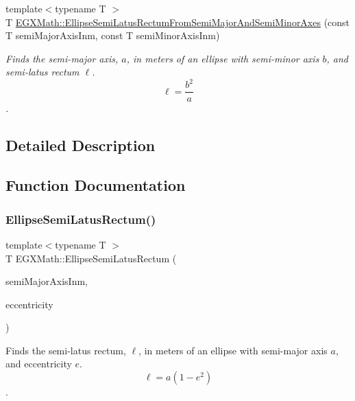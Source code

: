 \begin{DoxyCompactItemize}
{\footnotesize template$<$typename T $>$ }\\T \mbox{\hyperlink{group___e_g_x_math-_geometry-2_d-_ellipse-_semi_latus_rectum_ga8bb9235fdb20e3257489049022f4aeba}{E\+G\+X\+Math\+::\+Ellipse\+Semi\+Latus\+Rectum\+From\+Semi\+Major\+And\+Semi\+Minor\+Axes}} (const T semi\+Major\+Axis\+Inm, const T semi\+Minor\+Axis\+Inm)
\begin{DoxyCompactList}\small\item\em Finds the semi-\/major axis, $a$, in meters of an ellipse with semi-\/minor axis $b$, and semi-\/latus rectum $\ell$. \[ \ell= \frac{b^2}{a} \]. \end{DoxyCompactList}\end{DoxyCompactItemize}


\subsection{Detailed Description}


\subsection{Function Documentation}
\mbox{\label{group___e_g_x_math-_geometry-2_d-_ellipse-_semi_latus_rectum_gacfd1844eb4ef3d1ee3c0b460a6442ae6}} 
\subsubsection{\texorpdfstring{Ellipse\+Semi\+Latus\+Rectum()}{EllipseSemiLatusRectum()}}
{\footnotesize\ttfamily template$<$typename T $>$ \\
T E\+G\+X\+Math\+::\+Ellipse\+Semi\+Latus\+Rectum (\begin{DoxyParamCaption}\item[{const T}]{semi\+Major\+Axis\+Inm,  }\item[{const T}]{eccentricity }\end{DoxyParamCaption})}



Finds the semi-\/latus rectum, $\ell$, in meters of an ellipse with semi-\/major axis $a$, and eccentricity $e$. \[ \ell=a(1-e^2) \]. 

